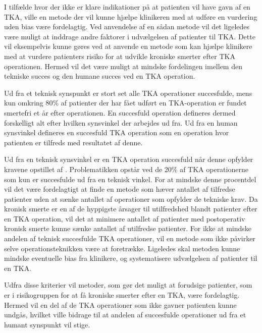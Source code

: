 I tilfælde hvor der ikke er klare indikationer på at patienten vil have gavn af en TKA, ville en metode der vil kunne hjælpe klinikeren med at udføre en vurdering uden bias være fordelagtig. Ved anvendelse af en sådan metode vil det ligeledes være muligt at inddrage andre faktorer i udvælgelsen af patienter til TKA. Dette vil eksempelvis kunne gøres ved at anvende en metode som kan hjælpe klinikere med at vurdere patienters risiko for at udvikle kroniske smerter efter TKA operationen. Hermed vil det være muligt at mindske fordelingen imellem den tekniske succes og den humane succes ved en TKA operation.

Ud fra et teknisk synspunkt er stort set alle TKA operationer succesfulde, mens kun omkring 80\% af patienter der har fået udført en TKA-operation er fundet smertefri et år efter operationen. \citep{aarsrapport2016}
\citep{Bourne2010} En succesfuld operation defineres dermed forskelligt alt efter hvilken synsvinkel der arbejdes ud fra. Ud fra en human synsvinkel defineres en succesfuld TKA operation som en operation hvor patienten er tilfreds med resultatet af denne. 


Ud fra en teknisk synsvinkel er en TKA operation succesfuld når denne opfylder kravene opstillet af \cite{aarsrapport2016}. Problematikken opstår ved de 20\% af TKA operationerne som kun er succesfulde ud fra en teknisk vinkel. For at mindske denne procentdel vil det være fordelagtigt at finde en metode som hæver antallet af tilfredse patienter uden at sænke antallet af operationer som opfylder de tekniske krav. Da kronisk smerte er en af de hyppigste årsager til utilfredshed blandt patienter efter en TKA operation, vil det at minimere antallet af patienter med postoperativ kronisk smerte kunne sænke antallet af utilfredse patienter. \citep{Bourne2010} For ikke at mindske andelen af teknisk succesfulde TKA operationer, vil en metode som ikke påvirker selve operationsteknikken være at foretrække. Ligeledes skal metoden kunne mindske eventuelle bias fra klinikere, og systematisere udvælgelsen af patienter til en TKA. 

Udfra disse kriterier vil metoder, som gør det muligt at forudsige patienter, som er i risikogruppen for at få kroniske smerter efter en TKA, være fordelagtig. Hermed vil en del af de TKA operationer som ikke gavner patienten kunne undgås, hvilket ville bidrage til at andelen af succesfulde operationer ud fra et humant synspunkt vil stige.

